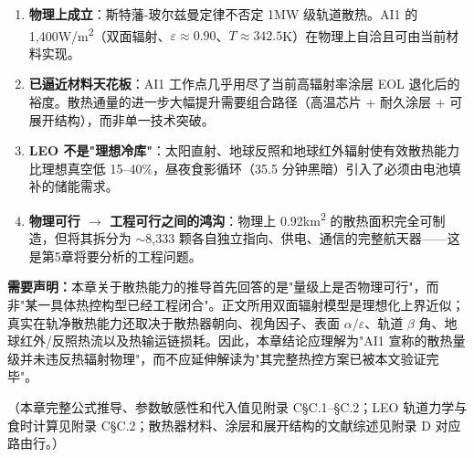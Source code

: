 \begin{enumerate}[leftmargin=*]
    \item \textbf{物理上成立}：斯特藩-玻尔兹曼定律不否定 1\;MW 级轨道散热。AI1 的 1,400\;W/m\textsuperscript{2}（双面辐射、$\varepsilon\approx0.90$、$T\approx342.5$\;K）在物理上自洽且可由当前材料实现。
    \item \textbf{已逼近材料天花板}：AI1 工作点几乎用尽了当前高辐射率涂层 EOL 退化后的裕度。散热通量的进一步大幅提升需要组合路径（高温芯片 + 耐久涂层 + 可展开结构），而非单一技术突破。
    \item \textbf{LEO 不是"理想冷库"}：太阳直射、地球反照和地球红外辐射使有效散热能力比理想真空低 15--40\%，昼夜食影循环（35.5 分钟黑暗）引入了必须由电池填补的储能需求。
    \item \textbf{物理可行 $\rightarrow$ 工程可行之间的鸿沟}：物理上 0.92\;km\textsuperscript{2} 的散热面积完全可制造，但将其拆分为 $\sim$8,333 颗各自独立指向、供电、通信的完整航天器——这是第5章将要分析的工程问题。
\end{enumerate}

\bigskip
\noindent\textbf{需要声明：}本章关于散热能力的推导首先回答的是"量级上是否物理可行"，而非"某一具体热控构型已经工程闭合"。正文所用双面辐射模型是理想化上界近似；真实在轨净散热能力还取决于散热器朝向、视角因子、表面 $\alpha/\varepsilon$、轨道 $\beta$ 角、地球红外/反照热流以及热输运链损耗。因此，本章结论应理解为"AI1 宣称的散热量级并未违反热辐射物理"，而不应延伸解读为"其完整热控方案已被本文验证完毕"。

（本章完整公式推导、参数敏感性和代入值见附录 C\;\S C.1--\S C.2；LEO 轨道力学与食时计算见附录 C\;\S C.2；散热器材料、涂层和展开结构的文献综述见附录 D 对应路由行。）

\endinput
